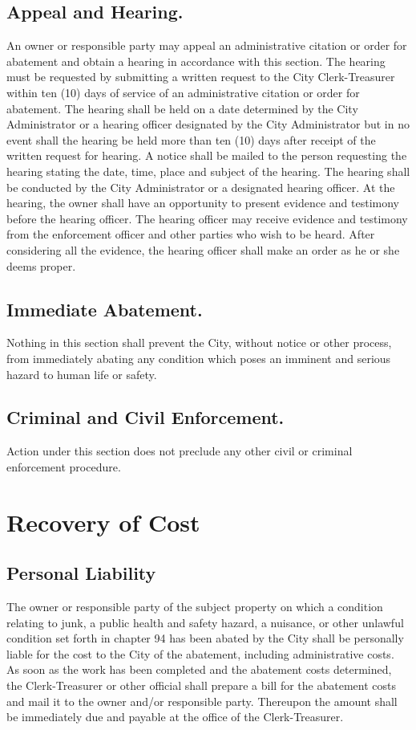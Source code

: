 \subsection{Appeal and Hearing.}
An owner or responsible party may appeal an administrative citation or order for abatement and obtain a hearing in accordance with this section. The hearing must be requested by submitting a written request to the City Clerk-Treasurer within ten (10) days of service of an administrative citation or order for abatement. The hearing shall be held on a date determined by the City Administrator or a hearing officer designated by the City Administrator but in no event shall the hearing be held more than ten (10) days after receipt of the written request for hearing. A notice shall be mailed to the person requesting the hearing stating the date, time, place and subject of the hearing. The hearing shall be conducted by the City Administrator or a designated hearing officer. At the hearing, the owner shall have an opportunity to present evidence and testimony before the hearing officer. The hearing officer may receive evidence and testimony from the enforcement officer and other parties who wish to be heard. After considering all the evidence, the hearing officer shall make an order as he or she deems proper.
\subsection{Immediate Abatement.}
Nothing in this section shall prevent the City, without notice or other process, from immediately abating any condition which poses an imminent and serious hazard to human life or safety.
\subsection{Criminal and Civil Enforcement.}
Action under this section does not preclude any other civil or criminal enforcement procedure.\\

\section{Recovery of Cost}
\subsection{Personal Liability}
The owner or responsible party of the subject property on which a condition relating to junk, a public health and safety hazard, a nuisance, or other unlawful condition set forth in chapter 94 has been abated by the City shall be personally liable for the cost to the City of the abatement, including administrative costs. As soon as the work has been completed and the abatement costs determined, the Clerk-Treasurer or other official shall prepare a bill for the abatement costs and mail it to the owner and/or responsible party. Thereupon the amount shall be immediately due and payable at the office of the Clerk-Treasurer.
